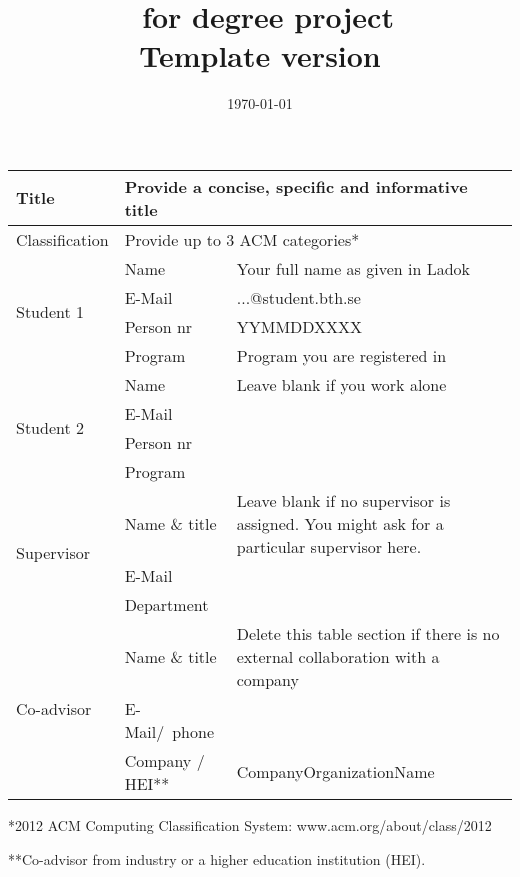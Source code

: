 \documentclass[12pt,a4paper,twoside]{article}
\title{\thePurpose\ for degree project\\\vspace{1mm}\small{Template version \theVersion}}
\author{\textsc{\theCourse}}
\date{\today}
\newcommand{\theCompany}{CompanyOrganizationName}
\begin{document}
\maketitle
\vspace*{-5mm}

\noindent %
\begin{tabular}{|l|l|p{9.3cm}|}
\hline
Title      		  & \multicolumn{2}{|p{12cm}|}{Provide a concise, specific and informative title} \\
\hline
Classification      		  & \multicolumn{2}{|l|}{Provide up to 3 ACM categories*} \\
\hline\hline
\multirow{4}{*}{Student 1}
 & Name           & Your full name as given in Ladok \\\cline{2-3}
 & E-Mail         & ...@student.bth.se \\\cline{2-3}
 & Person nr      & YYMMDDXXXX \\\cline{2-3}
 & Program        & Program you are registered in \\\cline{2-3}
\hline
\multirow{4}{*}{Student 2}
 & Name           & Leave blank if you work alone \\\cline{2-3}
 & E-Mail         &  \\\cline{2-3} 
 & Person nr      &  \\\cline{2-3}
 & Program        &  \\\cline{2-3}
\hline
\multirow{3}{*}{Supervisor}
 & Name \& title  & Leave blank if no supervisor is assigned. You might ask for a particular supervisor here. \\\cline{2-3}
 & E-Mail         &  \\\cline{2-3}
 & Department     &  \\
\hline
\multirow{3}{*}{Co-advisor}
 & Name \& title  & Delete this table section if there is no external collaboration with a company \\\cline{2-3}
 & E-Mail/~phone  &  \\\cline{2-3}
 & Company / HEI**       & \theCompany \\
\hline
\end{tabular}

\vspace{1mm}
\noindent
*2012 ACM Computing Classification System: www.acm.org/about/class/2012

\noindent
**Co-advisor from industry or a higher education institution (HEI).
\end{document}
